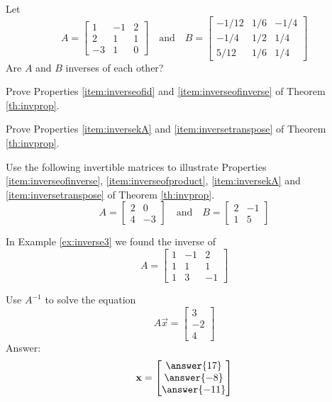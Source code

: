 \documentclass{ximera}
\begin{document}
\begin{problem} Let $$A=\begin{bmatrix}1&-1&2\\2&1&1\\-3&1&0\end{bmatrix}\quad\text{and}\quad B=\begin{bmatrix}-1/12&1/6&-1/4\\-1/4&1/2&1/4\\5/12&1/6&1/4\end{bmatrix}$$ Are $A$ and $B$ inverses of each other?

\begin{multipleChoice}
\end{multipleChoice}
\end{problem}



\begin{problem}
Prove Properties \ref{item:inverseofid} and \ref{item:inverseofinverse} of Theorem \ref{th:invprop}.
\end{problem}

\begin{problem}
Prove Properties \ref{item:inversekA} and \ref{item:inversetranspose} of Theorem \ref{th:invprop}.
\end{problem}

\begin{problem} Use the following invertible matrices to illustrate Properties \ref{item:inverseofinverse}, \ref{item:inverseofproduct}, \ref{item:inversekA} and \ref{item:inversetranspose} of Theorem \ref{th:invprop}.
$$A=\begin{bmatrix}2&0\\4&-3\end{bmatrix}\quad\text{and}\quad B=\begin{bmatrix}2&-1\\1&5\end{bmatrix}$$
\end{problem}

\begin{problem}
In Example \ref{ex:inverse3} we found the inverse of $$A=\begin{bmatrix}1&-1&2\\1&1&1\\1&3&-1\end{bmatrix}$$

Use $A^{-1}$ to solve the equation
$$A\vec{x}=\begin{bmatrix}3\\-2\\4\end{bmatrix}$$
Answer:
$$\vec{x}=\begin{bmatrix}\answer{17}\\\answer{-8}\\\answer{-11}\end{bmatrix}$$

\end{problem}
\end{document}
